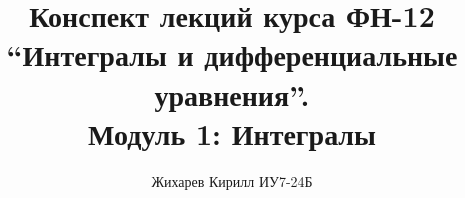\documentclass[a4paper]{article}
\title{Конспект лекций курса ФН-12 \\ ``Интегралы и дифференциальные уравнения''. \\ Модуль 1: Интегралы}
\author{Жихарев Кирилл ИУ7-24Б}
\date{ }
\begin{document}
  \maketitle
  \pagebreak

  \tableofcontents
  \pagebreak

  
  
  
  
\end{document}
